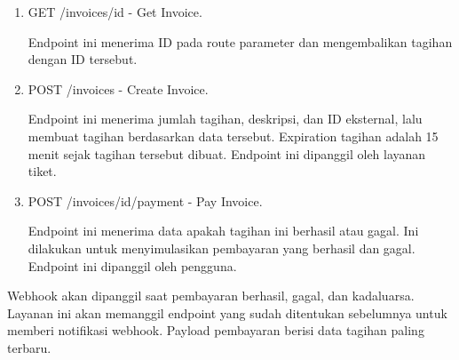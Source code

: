 \begin{enumerate}
      \item GET /invoices/{id} - Get Invoice.

            Endpoint ini menerima ID pada route parameter dan mengembalikan tagihan dengan ID tersebut.

      \item POST /invoices - Create Invoice.

            Endpoint ini menerima jumlah tagihan, deskripsi, dan ID eksternal, lalu membuat tagihan berdasarkan data tersebut. Expiration tagihan adalah 15 menit sejak tagihan tersebut dibuat. Endpoint ini dipanggil oleh layanan tiket.

      \item POST /invoices/{id}/payment - Pay Invoice.

            Endpoint ini menerima data apakah tagihan ini berhasil atau gagal. Ini dilakukan untuk menyimulasikan pembayaran yang berhasil dan gagal. Endpoint ini dipanggil oleh pengguna.
\end{enumerate}

Webhook akan dipanggil saat pembayaran berhasil, gagal, dan kadaluarsa. Layanan ini akan memanggil endpoint yang sudah ditentukan sebelumnya untuk memberi notifikasi webhook. Payload pembayaran berisi data tagihan paling terbaru.